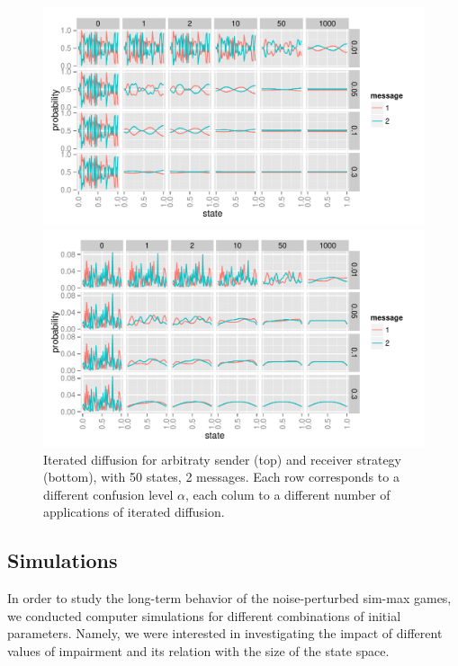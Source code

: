 \begin{figure}
  \centering

  \includegraphics[width=\textwidth]{plots/confusion_sender.pdf}
  
  \includegraphics[width=\textwidth]{plots/confusion_receiver.pdf}

  \caption{Iterated diffusion for arbitraty sender (top) and receiver
    strategy (bottom), with 50 states, 2 messages. Each row
    corresponds to a different confusion level $\alpha$, each colum to
    a different number of applications of iterated diffusion.}
  \label{fig:confusion-SenRec}
\end{figure}



\subsection{Simulations}

In order to study the long-term behavior of the noise-perturbed sim-max games, we conducted computer simulations for different combinations of initial parameters.
Namely, we were interested in investigating the impact of different values of impairment and its relation with the size of the state space.

